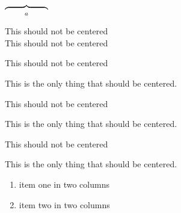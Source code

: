 \documentclass[oneside]{book}
\begin{document}


$\overbrace{\makebox[1.8cm]{}}_a$


\begin{minipage}{\linewidth}
This should not be centered\\
This should not be centered
\end{minipage}

\begin{minipage}{\linewidth}
This should not be centered
\begin{center}
This is the only thing that should be centered.
\end{center}
\end{minipage}

\begin{minipage}{\linewidth}
This should not be centered

\begin{centering}
This is the only thing that should be centered.\\
\end{centering}
\end{minipage}

\begin{minipage}{\linewidth}
This should not be centered

{\centering
This is the only thing that should be centered.\\
}
\end{minipage}

\begin{multicols}{2}
\begin{enumerate}
\item item one in two columns
\item item two in two columns
\end{enumerate}
\end{multicols}
\end{document}
